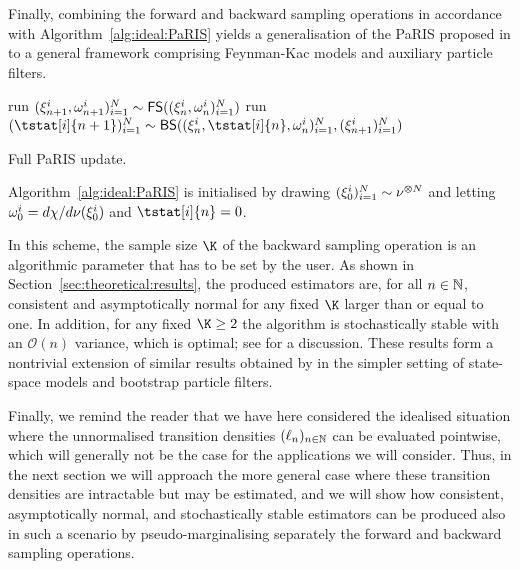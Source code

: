 Finally, combining the forward and backward sampling operations in accordance with Algorithm~\ref{alg:ideal:PaRIS} yields a generalisation of the PaRIS proposed in \cite{olsson:westerborn:2014b} to a general framework comprising Feynman-Kac models and auxiliary particle filters. 

\begin{algorithm}[h] 
    run $(\xi_{n + 1}^{i}, \omega_{n + 1}^{i})_{i = 1}^N \sim \mathsf{FS}((\xi_{n}^{i}, \omega_{n}^{i})_{i = 1}^N)$\;
    run $(\tstat[i]{n + 1})_{i = 1}^\N \sim \mathsf{BS}((\epart{n}{i}, \tstat[i]{n}, \ewght{n}{i})_{i = 1}^\N, (\epart{n + 1}{i})_{i = 1}^\N)$\;
    \medskip
\caption{Full PaRIS update.} \label{alg:ideal:PaRIS}
\end{algorithm}

Algorithm~\ref{alg:ideal:PaRIS} is initialised by drawing $(\xi_{0}^{i})_{i = 1}^N \sim \nu^{\varotimes N}$ and letting $\omega_{0}^{i} = d \chi / d \nu(\xi_{0}^{i})$ and $\tstat[i]{n} = 0$.  

In this scheme, the sample size $\K$ of the backward sampling operation is an algorithmic parameter that has to be set by the user. As shown in Section~\ref{sec:theoretical:results}, the produced estimators are, for all $n \in \mathbb{N}$, consistent and asymptotically normal for any fixed $\K$ larger than or equal to one. In addition, for any fixed $\K \geq 2$ the algorithm is stochastically stable with an $\mathcal{O}(n)$ variance, which is optimal; see \cite[Section~1]{olsson:westerborn:2014b} for a discussion. These results form a nontrivial extension of similar results obtained by \cite{olsson:westerborn:2014b} in the simpler setting of state-space models and bootstrap particle filters. 

Finally, we remind the reader that we have here considered the idealised situation where the unnormalised transition densities $(\ell_{n})_{n \in \mathbb{N}}$ can be evaluated pointwise, which will generally not be the case for the applications we will consider. Thus, in the next section we will approach the more general case where these transition densities are intractable but may be estimated, and we will show how consistent, asymptotically normal, and stochastically stable estimators can be produced also in such a scenario by pseudo-marginalising separately the forward and backward sampling operations. 
 
